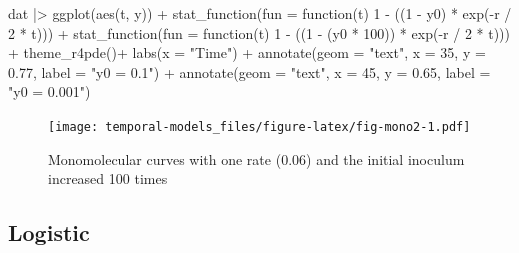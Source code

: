 \documentclass[
  letterpaper,
]{book}
\newenvironment{Shaded}{\begin{snugshade}}{\end{snugshade}}
\newcommand{\AttributeTok}[1]{\textcolor[rgb]{0.40,0.45,0.13}{#1}}
\newcommand{\ControlFlowTok}[1]{\textcolor[rgb]{0.00,0.23,0.31}{#1}}
\newcommand{\DecValTok}[1]{\textcolor[rgb]{0.68,0.00,0.00}{#1}}
\newcommand{\FloatTok}[1]{\textcolor[rgb]{0.68,0.00,0.00}{#1}}
\newcommand{\FunctionTok}[1]{\textcolor[rgb]{0.28,0.35,0.67}{#1}}
\newcommand{\NormalTok}[1]{\textcolor[rgb]{0.00,0.23,0.31}{#1}}
\newcommand{\SpecialCharTok}[1]{\textcolor[rgb]{0.37,0.37,0.37}{#1}}
\newcommand{\StringTok}[1]{\textcolor[rgb]{0.13,0.47,0.30}{#1}}
\begin{document}
\begin{Shaded}
\begin{Highlighting}[]
\NormalTok{dat }\SpecialCharTok{|\textgreater{}}
  \FunctionTok{ggplot}\NormalTok{(}\FunctionTok{aes}\NormalTok{(t, y)) }\SpecialCharTok{+}
  \FunctionTok{stat\_function}\NormalTok{(}\AttributeTok{fun =} \ControlFlowTok{function}\NormalTok{(t) }\DecValTok{1} \SpecialCharTok{{-}}\NormalTok{ ((}\DecValTok{1} \SpecialCharTok{{-}}\NormalTok{ y0) }\SpecialCharTok{*} \FunctionTok{exp}\NormalTok{(}\SpecialCharTok{{-}}\NormalTok{r }\SpecialCharTok{/} \DecValTok{2} \SpecialCharTok{*}\NormalTok{ t))) }\SpecialCharTok{+}
  \FunctionTok{stat\_function}\NormalTok{(}\AttributeTok{fun =} \ControlFlowTok{function}\NormalTok{(t) }\DecValTok{1} \SpecialCharTok{{-}}\NormalTok{ ((}\DecValTok{1} \SpecialCharTok{{-}}\NormalTok{ (y0 }\SpecialCharTok{*} \DecValTok{100}\NormalTok{)) }\SpecialCharTok{*} \FunctionTok{exp}\NormalTok{(}\SpecialCharTok{{-}}\NormalTok{r }\SpecialCharTok{/} \DecValTok{2} \SpecialCharTok{*}\NormalTok{ t))) }\SpecialCharTok{+}
  \FunctionTok{theme\_r4pde}\NormalTok{()}\SpecialCharTok{+}
  \FunctionTok{labs}\NormalTok{(}\AttributeTok{x =} \StringTok{"Time"}\NormalTok{) }\SpecialCharTok{+}
  \FunctionTok{annotate}\NormalTok{(}\AttributeTok{geom =} \StringTok{"text"}\NormalTok{, }\AttributeTok{x =} \DecValTok{35}\NormalTok{, }\AttributeTok{y =} \FloatTok{0.77}\NormalTok{, }\AttributeTok{label =} \StringTok{"y0 = 0.1"}\NormalTok{) }\SpecialCharTok{+}
  \FunctionTok{annotate}\NormalTok{(}\AttributeTok{geom =} \StringTok{"text"}\NormalTok{, }\AttributeTok{x =} \DecValTok{45}\NormalTok{, }\AttributeTok{y =} \FloatTok{0.65}\NormalTok{, }\AttributeTok{label =} \StringTok{"y0 = 0.001"}\NormalTok{)}
\end{Highlighting}
\end{Shaded}

\begin{figure}

\texttt{[image: temporal-models\_files/figure-latex/fig-mono2-1.pdf]} \hfill{}

\caption{\label{fig-mono2}Monomolecular curves with one rate (0.06) and
the initial inoculum increased 100 times}

\end{figure}

\hypertarget{logistic}{%
\subsection{Logistic}\label{logistic}}
\end{document}
